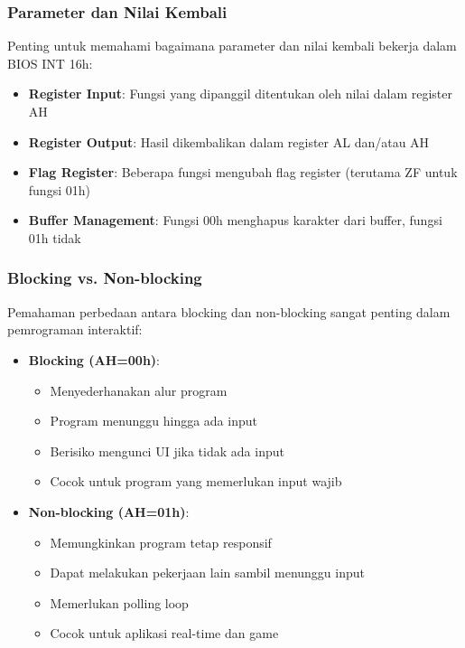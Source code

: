 \documentclass[../main.tex]{subfiles}
\begin{document}
            \subsubsection{Parameter dan Nilai Kembali}
Penting untuk memahami bagaimana parameter dan nilai kembali bekerja dalam BIOS INT 16h:

\begin{itemize}
    \item \textbf{Register Input}: Fungsi yang dipanggil ditentukan oleh nilai dalam register AH
    \item \textbf{Register Output}: Hasil dikembalikan dalam register AL dan/atau AH
    \item \textbf{Flag Register}: Beberapa fungsi mengubah flag register (terutama ZF untuk fungsi 01h)
    \item \textbf{Buffer Management}: Fungsi 00h menghapus karakter dari buffer, fungsi 01h tidak
\end{itemize}

            \subsubsection{Blocking vs. Non-blocking}
Pemahaman perbedaan antara blocking dan non-blocking sangat penting dalam pemrograman interaktif:

\begin{itemize}
    \item \textbf{Blocking (AH=00h)}:
        \begin{itemize}
            \item Menyederhanakan alur program
            \item Program menunggu hingga ada input
            \item Berisiko mengunci UI jika tidak ada input
            \item Cocok untuk program yang memerlukan input wajib
        \end{itemize}
    \item \textbf{Non-blocking (AH=01h)}:
        \begin{itemize}
            \item Memungkinkan program tetap responsif
            \item Dapat melakukan pekerjaan lain sambil menunggu input
            \item Memerlukan polling loop
            \item Cocok untuk aplikasi real-time dan game
        \end{itemize}
\end{itemize}
\end{document}

